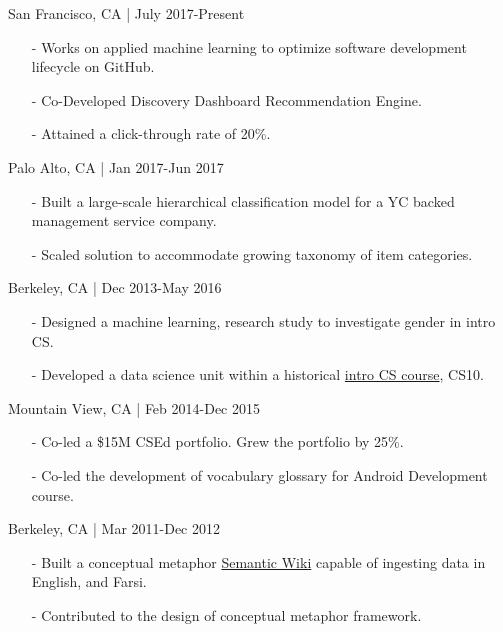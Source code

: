 \documentclass[11pt,article,oneside]{memoir}
\begin{document}
 \hfill San Francisco, CA | July 2017-Present
\begin{itemize}[nolistsep]
\item[-]Works on applied machine learning to optimize software development lifecycle on GitHub.
\item[-]Co-Developed Discovery Dashboard Recommendation Engine.
\item[-]Attained a click-through rate of 20\%.
\end{itemize} 

 \hfill Palo Alto, CA | Jan 2017-Jun 2017
\begin{itemize}[nolistsep]
\item[-]Built a large-scale hierarchical classification model for a YC backed management service company.
\item[-]Scaled solution to accommodate growing taxonomy of item categories.
\end{itemize} 

 \hfill Berkeley, CA | Dec 2013-May 2016
\begin{itemize}[noitemsep,nolistsep]
\item[-] Designed a machine learning, research study to investigate gender in intro CS.
\item[-] Developed a data science unit within a historical \href{http://www.whitehouse.gov/the-press-office/2014/12/08/fact-sheet-new-commitments-support-computer-science-education}{intro CS course}, CS10.
\end{itemize}

 \hfill Mountain View, CA | Feb 2014-Dec 2015
\begin{itemize}[nolistsep]
\item[-]Co-led a \$15M CSEd portfolio. Grew the portfolio by 25\%.
\item[-]Co-led the development of vocabulary glossary for Android Development course.
\end{itemize} 

 \hfill Berkeley, CA | Mar 2011-Dec 2012
\begin{itemize}[nolistsep]
\item[-] Built a conceptual metaphor \href{http://metaphor.icsi.berkeley.edu}{Semantic Wiki} capable of ingesting data in English, and Farsi.
\item[-] Contributed to the design of conceptual metaphor framework.
\end{itemize} 
\end{document}
